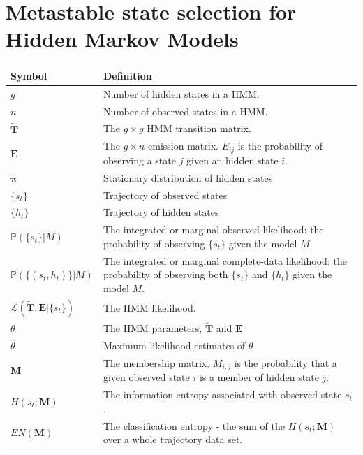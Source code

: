 \let\textcircled=\pgftextcircled
\chapter{Metastable state selection for Hidden Markov Models}
\label{chap:hmm}


\begin{table}
    \centering
    \begin{tabularx}{0.9\textwidth}{ |l| >{\raggedright\arraybackslash}X | } 
    \hline
    \textbf{Symbol}  &  \textbf{Definition} \\
    \hline\hline
    $g$ & Number of hidden states in a HMM. \\
    $n$ & Number of observed states in a HMM. \\
    $\mathbf{\tilde{T}}$ & The $g\times g$ HMM transition matrix. \\
    $\mathbf{E}$ & The $g \times n$ emission matrix. $E_{ij}$ is the probability of observing a state $j$ given an hidden state $i$. \\
    $\tilde{\bm{\pi}}$ & Stationary distribution of hidden states \\
    $\{s_{t}\}$ & Trajectory of observed states \\
    $\{h_{t}\}$ & Trajectory of hidden states \\
    $\mathbb{P}(\{s_t\}|M)$ & The integrated or marginal observed likelihood: the probability of observing $\{s_t\}$ given the model $M$. \\
    $\mathbb{P}(\{(s_t, h_t)\}|M)$ & The integrated or marginal complete-data likelihood: the probability of observing both $\{s_t\}$ and $\{h_t\}$ given the model $M$.  \\
    $\mathcal{L}(\tilde{\mathbf{T}}, \mathbf{E}| \{s_t\})$ & The HMM likelihood. \\
    $\theta$ & The HMM parameters, $\tilde{\mathbf{T}}$ and $\mathbf{E}$\\
    $\hat{\theta}$ & Maximum likelihood estimates of $\theta$ \\
    $\mathbf{M}$ & The membership matrix. $M_{i,j}$ is the probability that a given observed state $i$ is a member of hidden state $j$. \\
    $H(s_{t}; \mathbf{M})$ & The information entropy associated with observed state $s_{t}$. \\
    $EN(\mathbf{M})$ & The classification entropy - the sum of the $H(s_{t}; \mathbf{M})$ over a whole trajectory data set. \\
    \hline
    \end{tabularx}
    \label{tab:hmm_symbols}
\end{table}

